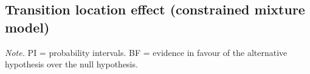 \documentclass[
  english,
  man,floatsintext]{apa7}
\begin{document}
\begin{appendix}
\section{}
\hypertarget{transition-location-effect-constrained-mixture-model}{%
\subsection{Transition location effect (constrained mixture
model)}\label{transition-location-effect-constrained-mixture-model}}

\begin{center}
\begin{ThreePartTable}

\begin{TableNotes}[para]
\normalsize{\textit{Note.} PI = probability intervals. BF = evidence in favour of the alternative hypothesis over the null hypothesis.}
\end{TableNotes}

\footnotesize{

}
\end{ThreePartTable}
\end{center}
\end{appendix}
\end{document}
